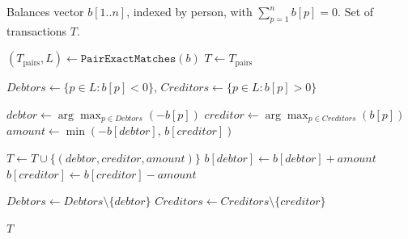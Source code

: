 \begin{algorithmic}[1]
    \INPUT  Balances vector $b[1..n]$, indexed by person, with $\sum_{p=1}^{n} b[p] = 0$.
    \OUTPUT Set of transactions $T$.

    \State $(T_{\text{pairs}}, L) \leftarrow \texttt{PairExactMatches}(b)$ 
    \State $T \leftarrow T_{\text{pairs}}$

    \State $\textit{Debtors} \leftarrow \{p \in L : b[p] < 0\}$, $\textit{Creditors} \leftarrow \{p \in L : b[p] > 0\}$

        \State $debtor \leftarrow \arg\max_{p \in \textit{Debtors}} (-b[p])$
        \State $creditor \leftarrow \arg\max_{p \in \textit{Creditors}} (b[p])$
        \State $amount \leftarrow \min(-b[debtor],\, b[creditor])$

        \State $T \leftarrow T \cup \{(debtor, creditor, amount)\}$
        \State $b[debtor] \leftarrow b[debtor] + amount$
        \State $b[creditor] \leftarrow b[creditor] - amount$

            \State $\textit{Debtors} \leftarrow \textit{Debtors} \setminus \{debtor\}$
        \EndIf
            \State $\textit{Creditors} \leftarrow \textit{Creditors} \setminus \{creditor\}$
        \EndIf
    \EndWhile

    \State \Return $T$

\end{algorithmic}